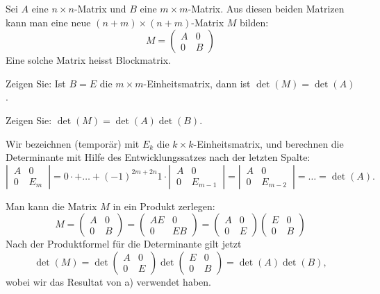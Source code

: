 Sei $A$ eine $n\times n$-Matrix und $B$ eine $m\times m$-Matrix. Aus diesen beiden
Matrizen kann man eine neue $(n+m)\times(n+m)$-Matrix $M$ bilden:
\[
M=\begin{pmatrix}
A&0\\
0&B
\end{pmatrix}
\]
Eine solche Matrix heisst Blockmatrix.
\begin{teilaufgaben}
\item
Zeigen Sie:
Ist $B=E$ die $m\times m$-Einheitsmatrix, dann ist $\det(M)=\det(A)$.
\item
Zeigen Sie:
$\det(M)=\det(A)\det(B)$.
\end{teilaufgaben}

\begin{loesung}
\begin{teilaufgaben}
\item Wir bezeichnen (temporär) mit $E_k$ die $k\times k$-Einheitsmatrix,
und berechnen die Determinante mit Hilfe des Entwicklungssatzes nach der
letzten Spalte:
\[
\left|\,
\begin{matrix}
A&0\\
0&E_m
\end{matrix}
\,\right|
=0\cdot +\dots+(-1)^{2m+2n}1\cdot
\left|\,
\begin{matrix}
A&0\\
0&E_{m-1}
\end{matrix}
\,\right|
=
\left|\,
\begin{matrix}
A&0\\
0&E_{m-2}
\end{matrix}
\,\right|
=\dots=
\det(A).
\]

\item
Man kann die Matrix $M$ in ein Produkt zerlegen:
\[
M=
\begin{pmatrix}
A&0\\
0&B
\end{pmatrix}
=
\begin{pmatrix}
AE&0\\
0&EB
\end{pmatrix}
=
\begin{pmatrix}
A&0\\
0&E
\end{pmatrix}
\begin{pmatrix}
E&0\\
0&B
\end{pmatrix}
\]
Nach der Produktformel für die Determinante gilt jetzt
\[
\det(M) =
\det
\begin{pmatrix}
A&0\\
0&E
\end{pmatrix}
\det
\begin{pmatrix}
E&0\\
0&B
\end{pmatrix}
=\det(A)\det(B),
\]
wobei wir das Resultat von a) verwendet haben.
\qedhere
\end{teilaufgaben}
\end{loesung}

